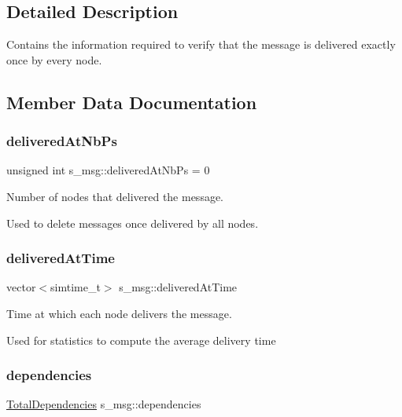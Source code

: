 \subsection{Detailed Description}
Contains the information required to verify that the message is delivered exactly once by every node. 

\subsection{Member Data Documentation}
\mbox{\label{structs__msg_a88a6cac0463627f92d12acb67755186d}} 
\subsubsection{\texorpdfstring{delivered\+At\+Nb\+Ps}{deliveredAtNbPs}}
{\footnotesize\ttfamily unsigned int s\+\_\+msg\+::delivered\+At\+Nb\+Ps = 0}



Number of nodes that delivered the message. 

Used to delete messages once delivered by all nodes. \mbox{\label{structs__msg_a25acd8d8afeacf207f402c8362fe452c}} 
\subsubsection{\texorpdfstring{delivered\+At\+Time}{deliveredAtTime}}
{\footnotesize\ttfamily vector$<$simtime\+\_\+t$>$ s\+\_\+msg\+::delivered\+At\+Time}



Time at which each node delivers the message. 

Used for statistics to compute the average delivery time \mbox{\label{structs__msg_a0683a931a64bb9e40c4da98dbd5bc836}} 
\subsubsection{\texorpdfstring{dependencies}{dependencies}}
{\footnotesize\ttfamily \hyperlink{class_total_dependencies}{Total\+Dependencies} s\+\_\+msg\+::dependencies}



